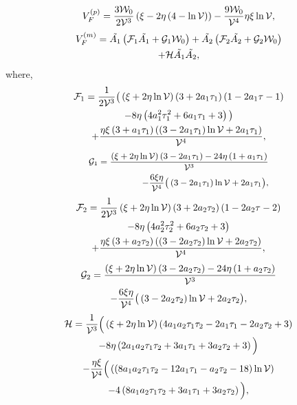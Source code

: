 \documentclass[doublecol]{epl2}
\begin{document}
\begin{equation}\small
    V_F^{(p)}=\frac{3\mathcal{W}_0}{2\mathcal{V}^3}\left(\xi-2\eta\left(4-\ln\mathcal{V}\right)\right)-\frac{9\mathcal{W}_0}{\mathcal{V}^4}\eta\xi\ln\mathcal{V},
\end{equation}
\begin{multline}\small
    V_F^{(m)}=\Tilde{A_1}\left(\mathcal{F}_1\Tilde{A_1}+\mathcal{G}_1\mathcal{W}_0\right)  +\Tilde{A_2}\left(\mathcal{F}_2\Tilde{A_2}+\mathcal{G}_2\mathcal{W}_0\right)\\ + \mathcal{H}\Tilde{A_1}\Tilde{A_2},
\end{multline}
where,
\begin{multline}\small
\mathcal{F}_1=\frac{1}{2\mathcal{V}^3}\big(\left(\xi+2\eta\ln\mathcal{V}\right)\left(3+2a_1\tau_1\right)\left(1-2a_1\tau-1\right)\\-8\eta\left(4a_1^2\tau_1^2+6a_1\tau_1+3\right)\big)\\ + \frac{\eta\xi\left(3+a_1\tau_1\right)\left(\left(3-2a_1\tau_1\right)\ln\mathcal{V}+2a_1\tau_1\right)}{\mathcal{V}^4},
\end{multline}
\begin{equation}\small
   \begin{split}
\mathcal{G}_1=\frac{\left(\xi+2\eta\ln\mathcal{V}\right)\left(3-2a_1\tau_1\right)-24\eta\left(1+a_1\tau_1\right)}{\mathcal{V}^3} \\- \frac{6\xi\eta}{\mathcal{V}^4}\big(\left(3-2a_1\tau_1\right)\ln\mathcal{V}+2a_1\tau_1\big),
\end{split} 
\end{equation}
\begin{multline}\small
    \mathcal{F}_2=\frac{1}{2\mathcal{V}^3}\left(\xi+2\eta\ln\mathcal{V}\right)\left(3+2a_2\tau_2\right)\left(1-2a_2\tau-2\right)\\-8\eta\left(4a_2^2\tau_2^2+6a_2\tau_2+3\right)\\ + \frac{\eta\xi\left(3+a_2\tau_2\right)\left(\left(3-2a_2\tau_2\right)\ln\mathcal{V}+2a_2\tau_2\right)}{\mathcal{V}^4},
\end{multline}
\begin{multline}\small
    \mathcal{G}_2=\frac{\left(\xi+2\eta\ln\mathcal{V}\right)\left(3-2a_2\tau_2\right)-24\eta\left(1+a_2\tau_2\right)}{\mathcal{V}^3}\\
    - \frac{6\xi\eta}{\mathcal{V}^4}\big(\left(3-2a_2\tau_2\right)\ln\mathcal{V}+2a_2\tau_2\big),
\end{multline}
\begin{multline}\small
    \mathcal{H}=\frac{1}{\mathcal{V}^3}\Big(\left(\xi+2\eta\ln\mathcal{V}\right)\left(4a_1a_2\tau_1\tau_2-2a_1\tau_1-2a_2\tau_2+3\right) \\
    -8\eta\left(2a_1a_2\tau_1\tau_2+3a_1\tau_1+3a_2\tau_2+3\right)\Big) \\ - \frac{\eta\xi}{\mathcal{V}^4}\Big(\left(\left(8a_1a_2\tau_1\tau_2-12a_1\tau_1-a_2\tau_2-18\right)\ln\mathcal{V}\right) \\
    -4\left(8a_1a_2\tau_1\tau_2+3a_1\tau_1+3a_2\tau_2\right)\Big),
\end{multline}
\end{document}
